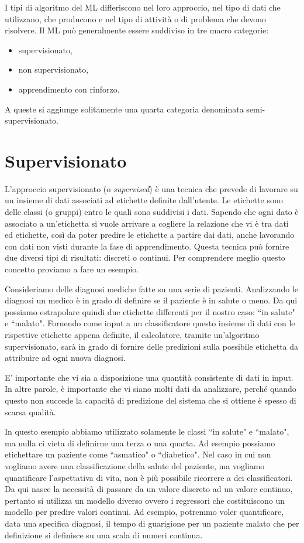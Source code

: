 \documentclass[12pt,italian]{report}
\begin{document}
I tipi di algoritmo del ML differiscono nel loro approccio, nel tipo di dati che utilizzano, che producono e nel tipo di attività o di problema che devono risolvere. Il ML può generalmente essere suddiviso in tre macro categorie: 
\begin{itemize}
	\item supervisionato,
	\item non supervisionato,
	\item apprendimento con rinforzo.
\end{itemize}
A queste si aggiunge solitamente una quarta categoria denominata semi-supervisionato.


\section{Supervisionato}

L'approccio supervisionato (o \emph{supervised}) è una tecnica che prevede di lavorare su un insieme di dati associati ad etichette definite dall'utente. Le etichette sono delle classi (o gruppi) entro le quali sono suddivisi i dati. Sapendo che ogni dato è associato a un'etichetta si vuole arrivare a cogliere la relazione che vi è tra dati ed etichette, così da poter predire le etichette a partire dai dati, anche lavorando con dati non visti durante la fase di apprendimento.
Questa tecnica può fornire due diversi tipi di risultati: discreti o continui. Per comprendere meglio questo concetto proviamo a fare un esempio.

Consideriamo delle diagnosi mediche fatte su una serie di pazienti. Analizzando le diagnosi un medico è in grado di definire se il paziente è in salute o meno. Da qui possiamo estrapolare quindi due etichette differenti per il nostro caso: ``in salute" e ``malato". Fornendo come input a un classificatore questo insieme di dati con le rispettive etichette appena definite, il calcolatore, tramite un'algoritmo supervisionato, sarà in grado di fornire delle predizioni sulla possibile etichetta da attribuire ad ogni nuova diagnosi.

E' importante che vi sia a disposizione una quantità consistente di dati in input. In altre parole, è importante che vi siano molti dati da analizzare, perché quando questo non succede la capacità di predizione del sistema che si ottiene è spesso di scarsa qualità.

In questo esempio abbiamo utilizzato solamente le classi ``in salute" e ``malato", ma nulla ci vieta di definirne una terza o una quarta. Ad esempio possiamo etichettare un paziente come ``asmatico" o ``diabetico".
Nel caso in cui non vogliamo avere una classificazione della salute del paziente, ma vogliamo quantificare l'aspettativa di vita, non è più possibile ricorrere a dei classificatori. Da qui nasce la necessità di passare da un valore discreto ad un valore continuo, pertanto si utilizza un modello diverso ovvero i regressori che costituiscono un modello per predire valori continui. Ad esempio, potremmo voler quantificare, data una specifica diagnosi, il tempo di guarigione per un paziente malato che per definizione si definisce su una scala di numeri continua.
\end{document}
